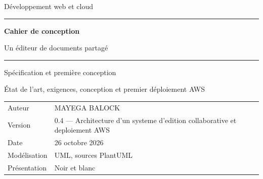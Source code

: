 \documentclass[10pt,a4paper,oneside]{report}
\begin{document}
\raggedright
\hypersetup{pageanchor=false}
\begin{titlepage}
\vspace*{22mm}
{\large Développement web et cloud\par}
\vspace{12mm}\hrule\vspace{8mm}
{\Huge\bfseries Cahier de conception\par}
\vspace{6mm}
{\LARGE Un éditeur de documents partagé\par}
\vspace{8mm}\hrule
\vspace{16mm}
{\Large Spécification et première conception\par}
\vspace{4mm}
{\large État de l'art, exigences, conception et premier déploiement AWS\par}
\vfill
\begin{tabular}{@{}ll@{}}
Auteur & MAYEGA BALOCK\\
Version & 0.4 --- Architecture d'un systeme d'edition collaborative et deploiement  AWS \\
Date & 26 octobre 2026\\
Modélisation & UML, sources PlantUML\\
Présentation & Noir et blanc
\end{tabular}
\vspace{10mm}
\end{titlepage}
\hypersetup{pageanchor=true}
\setcounter{tocdepth}{1}
\tableofcontents
\clearpage
{}





\end{document}
